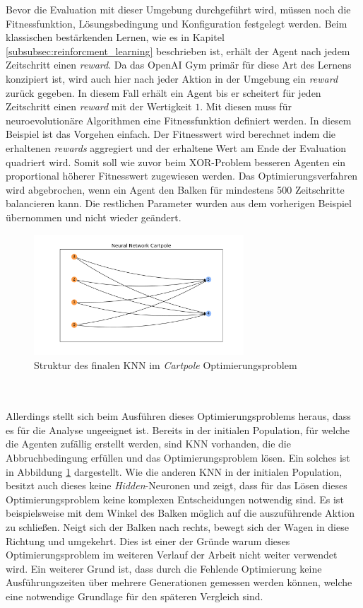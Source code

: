 Bevor die Evaluation mit dieser Umgebung durchgeführt wird, müssen noch die Fitnessfunktion, Lösungsbedingung und Konfiguration festgelegt werden. Beim klassischen bestärkenden Lernen, wie es in Kapitel \ref{subsubsec:reinforcment_learning} beschrieben ist, erhält der Agent nach jedem Zeitschritt einen \emph{reward}. Da das OpenAI Gym primär für diese Art des Lernens konzipiert ist, wird auch hier nach jeder Aktion in der Umgebung ein \emph{reward} zurück gegeben. In diesem Fall erhält ein Agent bis er scheitert für jeden Zeitschritt einen \emph{reward} mit der Wertigkeit $1$. Mit diesen muss für neuroevolutionäre Algorithmen eine Fitnessfunktion definiert werden. In diesem Beispiel ist das Vorgehen einfach. Der Fitnesswert wird berechnet indem die erhaltenen \emph{rewards} aggregiert und der erhaltene Wert am Ende der Evaluation quadriert wird. Somit soll wie zuvor beim XOR-Problem besseren Agenten ein proportional höherer Fitnesswert zugewiesen werden. Das Optimierungsverfahren wird abgebrochen, wenn ein Agent den Balken für mindestens 500 Zeitschritte balancieren kann. Die restlichen Parameter wurden aus dem vorherigen Beispiel übernommen und nicht wieder geändert.
\begin{figure}[!h]
	\centering
	\includegraphics[width=0.7\textwidth]{./img/pole_balancing_single_core/cartpole_neuroal_network.pdf} 
	\caption{Struktur des finalen \ac{KNN} im \emph{Cartpole} Optimierungsproblem}
	\label{fig:cartpole_neural_network}
\end{figure}
\\\\
Allerdings stellt sich beim Ausführen dieses Optimierungsproblems heraus, dass es für die Analyse ungeeignet ist. Bereits in der initialen Population, für welche die Agenten zufällig erstellt werden, sind \ac{KNN} vorhanden, die die Abbruchbedingung erfüllen und das Optimierungsproblem lösen. Ein solches ist in Abbildung \ref{fig:cartpole_neural_network} dargestellt. Wie die anderen \ac{KNN} in der initialen Population, besitzt auch dieses keine \emph{Hidden}-Neuronen und zeigt, dass für das Lösen dieses Optimierungsproblem keine komplexen Entscheidungen notwendig sind. Es ist beispielsweise mit dem Winkel des Balken möglich auf die auszuführende Aktion zu schließen. Neigt sich der Balken nach rechts, bewegt sich der Wagen in diese Richtung und umgekehrt. Dies ist einer der Gründe warum dieses Optimierungsproblem im weiteren Verlauf der Arbeit nicht weiter verwendet wird. Ein weiterer Grund ist, dass durch die Fehlende Optimierung keine Ausführungszeiten über mehrere Generationen gemessen werden können, welche eine notwendige Grundlage für den späteren Vergleich sind.

